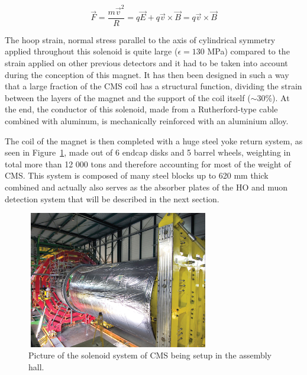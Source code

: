 \documentclass[a4paper, 10pt, openright]{report}
\begin{document}
\begin{equation}
\label{eq:Lorentz}
\overrightarrow{F} = \frac{m \overrightarrow{v}^2}{R} =  q \overrightarrow{E} + q \overrightarrow{v} \times \overrightarrow{B} = q \overrightarrow{v} \times \overrightarrow{B}
\end{equation}

The hoop strain, normal stress parallel to the axis of cylindrical symmetry applied throughout this solenoid is quite large ($\epsilon = 130$ MPa) compared to the strain applied on other previous detectors and it had to be taken into account during the conception of this magnet. It has then been designed in such a way that a large fraction of the \ac{CMS} coil has a structural function, dividing the strain between the layers of the magnet and the support of the coil itself ($\sim 30$\%). At the end, the conductor of this solenoid, made from a Rutherford-type cable combined with aluminum, is mechanically reinforced with an aluminium alloy.

The coil of the magnet is then completed with a huge steel yoke return system, as seen in Figure~\ref{fig:CMSMagnet}, made out of 6 endcap disks and 5 barrel wheels, weighting in total more than 12 000 tons and therefore accounting for most of the weight of \ac{CMS}. This system is composed of many steel blocks up to 620 mm thick combined and actually also serves as the absorber plates of the \ac{HO} and muon detection system that will be described in the next section. %

\begin{figure}[htbp]
\begin{center}
\includegraphics[width=8cm, height=6cm]{figs/CMSMagnet.jpg}
\caption{Picture of the solenoid system of \ac{CMS} being setup in the assembly hall.}
\label{fig:CMSMagnet}
\end{center}
\end{figure}
\end{document}
